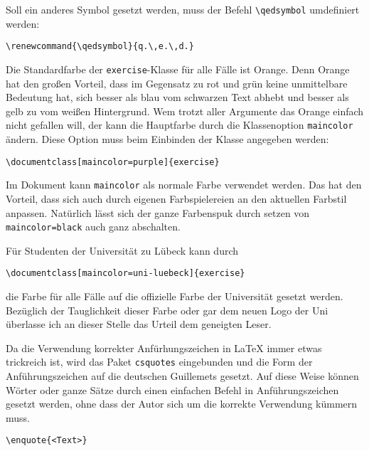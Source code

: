 \documentclass{exercise}
\begin{document}
    Soll ein anderes Symbol gesetzt werden, muss der Befehl \lstinline-\qedsymbol- umdefiniert werden:
    \begin{lstlisting}[gobble=6]
      \renewcommand{\qedsymbol}{q.\,e.\,d.}
    \end{lstlisting}

  \label{section-farbe}
    Die Standardfarbe der \texttt{exercise}-Klasse für alle Fälle ist Orange. Denn Orange hat den großen Vorteil, dass im Gegensatz zu rot und grün keine unmittelbare Bedeutung hat, sich besser als blau vom schwarzen Text abhebt und besser als gelb zu vom weißen Hintergrund. Wem trotzt aller Argumente das Orange einfach nicht gefallen will, der kann die Hauptfarbe durch die Klassenoption \lstinline{maincolor} ändern. Diese Option muss beim Einbinden der Klasse angegeben werden:
    \begin{lstlisting}[gobble=6]
      \documentclass[maincolor=purple]{exercise}
    \end{lstlisting}

    Im Dokument kann \lstinline{maincolor} als normale Farbe verwendet werden. Das hat den Vorteil, dass sich auch durch eigenen Farbspielereien an den aktuellen Farbstil anpassen. Natürlich lässt sich der ganze Farbenspuk durch setzen von \lstinline{maincolor=black} auch ganz abschalten.

    Für Studenten der Universität zu Lübeck kann durch
    \begin{lstlisting}[gobble=6]
      \documentclass[maincolor=uni-luebeck]{exercise}
    \end{lstlisting}
    die Farbe für alle Fälle auf die offizielle Farbe der Universität gesetzt werden. Bezüglich der Tauglichkeit dieser Farbe oder gar dem neuen Logo der Uni überlasse ich an dieser Stelle das Urteil dem geneigten Leser.

    Da die Verwendung korrekter Anfürhungszeichen in \LaTeX{} immer etwas trickreich ist, wird das Paket \texttt{csquotes} \cite{csquotes} eingebunden und die Form der Anführungszeichen auf die deutschen Guillemets gesetzt. Auf diese Weise können Wörter oder ganze Sätze durch einen einfachen Befehl in Anführungszeichen gesetzt werden, ohne dass der Autor sich um die korrekte Verwendung kümmern muss.
    \begin{lstlisting}[gobble=6]
      \enquote{<Text>}
    \end{lstlisting}
\end{document}
